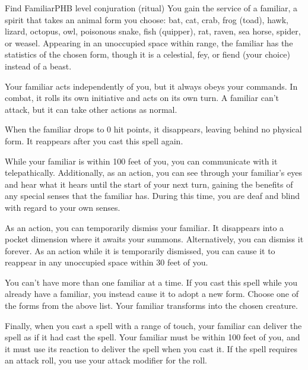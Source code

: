 \begin{spell}{Find Familiar}{PHB}{ level conjuration (ritual)}
{
}
You gain the service of a familiar, a spirit that takes an
animal form you choose: bat, cat, crab, frog (toad), hawk,
lizard, octopus, owl, poisonous snake, fish (quipper),
rat, raven, sea horse, spider, or weasel. Appearing in
an unoccupied space within range, the familiar has the
statistics of the chosen form, though it is a celestial, fey,
or fiend (your choice) instead of a beast.

Your familiar acts independently of you, but it always
obeys your commands. In combat, it rolls its own
initiative and acts on its own turn. A familiar can't
attack, but it can take other actions as normal.

When the familiar drops to 0 hit points, it disappears,
leaving behind no physical form. It reappears after you
cast this spell again.

While your familiar is within 100 feet of you, you
can communicate with it telepathically. Additionally,
as an action, you can see through your familiar's eyes
and hear what it hears until the start of your next turn,
gaining the benefits of any special senses that the
familiar has. During this time, you are deaf and blind
with regard to your own senses.

As an action, you can temporarily dismiss your
familiar. It disappears into a pocket dimension where it
awaits your summons. Alternatively, you can dismiss it
forever. As an action while it is temporarily dismissed,
you can cause it to reappear in any unoccupied space
within 30 feet of you.

You can't have more than one familiar at a time. If you
cast this spell while you already have a familiar, you
instead cause it to adopt a new form. Choose one of the
forms from the above list. Your familiar transforms into
the chosen creature.

Finally, when you cast a spell with a range of touch,
your familiar can deliver the spell as if it had cast the
spell. Your familiar must be within 100 feet of you, and
it must use its reaction to deliver the spell when you cast
it. If the spell requires an attack roll, you use your attack
modifier for the roll.
\end{spell}
